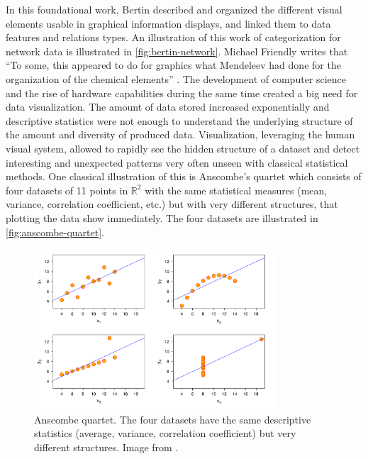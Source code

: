 In this foundational work, Bertin described and organized the different visual elements usable in graphical information displays, and linked them to data features and relations types.
An illustration of this work of categorization for network data is illustrated in \autoref{fig:bertin-network}.
Michael Friendly writes that ``To some, this appeared to do for graphics what Mendeleev had done for the organization of the chemical elements'' \cite{friendlyBriefHistoryData2008}.
The development of computer science and the rise of hardware capabilities during the same time created a big need for data visualization.
The amount of data stored increased exponentially \cite{hilbertWorldTechnologicalCapacity2011} and descriptive statistics were not enough to understand the underlying structure of the amount and diversity of produced data.
Visualization, leveraging the human visual system, allowed to rapidly see the hidden structure of a dataset and detect interesting and unexpected patterns very often unseen with classical statistical methods.
One classical illustration of this is Anscombe's quartet\cite{anscombeGraphsStatisticalAnalysis1973} which consists of four datasets of 11 points in $\mathbb{R} ^{2}$ with the same statistical measures (mean, variance, correlation coefficient, etc.) but with very different structures, that plotting the data show immediately.
The four datasets are illustrated in \autoref{fig:anscombe-quartet}.

\begin{figure}
    \centering %
    \includegraphics[width=0.8\textwidth]{static/figures/RelatedWork/Anscombe.pdf}
    \caption{Anscombe quartet. The four datasets have the same descriptive statistics (average, variance, correlation coefficient) but very different structures. Image from \cite{anscombeGraphsStatisticalAnalysis1973}.}
    \label{fig:anscombe-quartet}
\end{figure}

